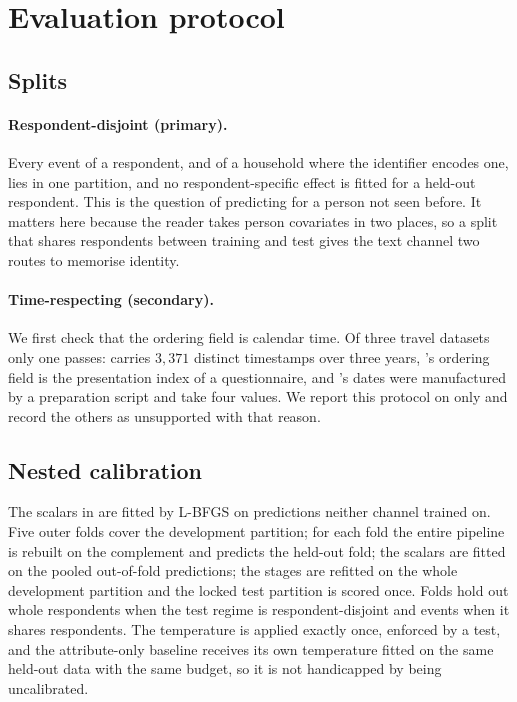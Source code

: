 \section{Evaluation protocol}
\label{sec:protocol}

\subsection{Splits}

\paragraph{Respondent-disjoint (primary).} Every event of a respondent, and of a household
where the identifier encodes one, lies in one partition, and no respondent-specific effect is
fitted for a held-out respondent. This is the question of predicting for a person not seen
before. It matters here because the reader takes person covariates in two places, so a split
that shares respondents between training and test gives the text channel two routes to
memorise identity.

\paragraph{Time-respecting (secondary).} We first check that the ordering field is calendar
time. Of three travel datasets only one passes:  carries $3{,}371$ distinct
timestamps over three years, 's ordering field is the presentation index
of a questionnaire, and 's dates were manufactured by a preparation script and
take four values. We report this protocol on  only and record the others as
unsupported with that reason.

\subsection{Nested calibration}

The scalars in  are fitted by L-BFGS on predictions neither channel trained
on. Five outer folds cover the development partition; for each fold the entire pipeline is
rebuilt on the complement and predicts the held-out fold; the scalars are fitted on the pooled
out-of-fold predictions; the stages are refitted on the whole development partition and the
locked test partition is scored once. Folds hold out whole respondents when the test regime is
respondent-disjoint and events when it shares respondents. The temperature is applied exactly
once, enforced by a test, and the attribute-only baseline receives its own temperature fitted
on the same held-out data with the same budget, so it is not handicapped by being
uncalibrated.

